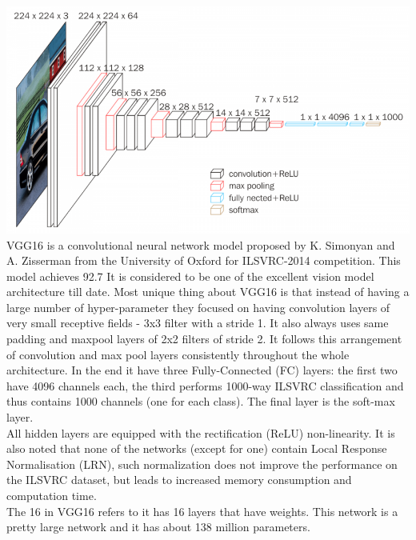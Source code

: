 \includegraphics[scale=0.5]{images/modelOne/vgg16.png}
VGG16 is a convolutional neural network model proposed by K. Simonyan and A. Zisserman from the University of Oxford for ILSVRC-2014 competition. This model achieves 92.7%
It is considered to be one of the excellent vision model architecture till date. Most unique thing about VGG16 is that instead of having a large number of hyper-parameter they focused on having convolution layers of very small receptive fields - 3x3 filter with a stride 1. It also always uses same padding and maxpool layers of 2x2 filters of stride 2. It follows this arrangement of convolution and max pool layers consistently throughout the whole architecture. In the end it have three Fully-Connected (FC) layers: the first two have 4096 channels each, the third performs 1000-way ILSVRC classification and thus contains 1000 channels (one for each class). The final layer is the soft-max layer. \\
All hidden layers are equipped with the rectification (ReLU) non-linearity. It is also noted that none of the networks (except for one) contain Local Response Normalisation (LRN), such normalization does not improve the performance on the ILSVRC dataset, but leads to increased memory consumption and computation time.\\
The 16 in VGG16 refers to it has 16 layers that have weights. This network is a pretty large network and it has about 138 million parameters.
~\cite{vgg16desc}